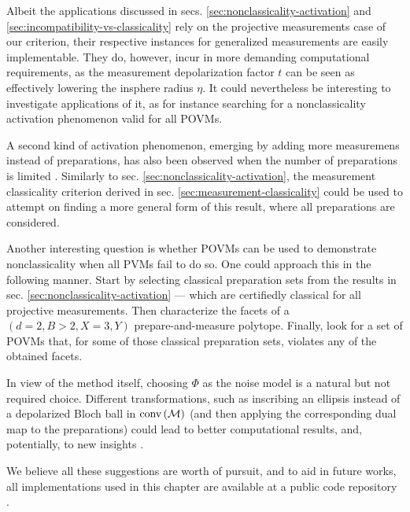         Albeit the applications discussed in secs. \ref{sec:nonclassicality-activation} and \ref{sec:incompatibility-vs-classicality} rely on the projective measurements case of our criterion, their respective instances for generalized measurements are easily implementable. They do, however, incur in more demanding computational requirements, as the measurement depolarization factor $t$ can be seen as effectively lowering the insphere radius $\eta$. It could nevertheless be interesting to investigate applications of it, as for instance searching for a nonclassicality activation phenomenon valid for all POVMs.

        A second kind of activation phenomenon, emerging by adding more measuremens instead of preparations, has also been observed when the number of preparations is limited \cite{poderini_pamcriteria_2020}. Similarly to sec. \ref{sec:nonclassicality-activation}, the measurement classicality criterion derived in sec. \ref{sec:measurement-classicality} could be used to attempt on finding a more general form of this result, where all preparations are considered.

        Another interesting question is whether POVMs can be used to demonstrate nonclassicality when all PVMs fail to do so. One could approach this in the following manner. Start by selecting classical preparation sets from the results in sec. \ref{sec:nonclassicality-activation} --- which are certifiedly classical for all projective measurements. Then characterize the facets of a $(d=2, B>2, X=3,Y)$ prepare-and-measure polytope. Finally, look for a set of POVMs that, for some of those classical preparation sets, violates any of the obtained facets.

        In view of the method itself, choosing $\Phi$ as the noise model is a natural but not required choice. Different transformations, such as inscribing an ellipsis instead of a depolarized Bloch ball in $\text{conv} \left( \mathcal{M} \right)$ (and then applying the corresponding dual map to the preparations) could lead to better computational results, and, potentially, to new insights \cite{fillettaz_algorithmic_2018}.

        We believe all these suggestions are worth of pursuit, and to aid in future works, all implementations used in this chapter are available at a public code repository \cite{classicality_repository}.